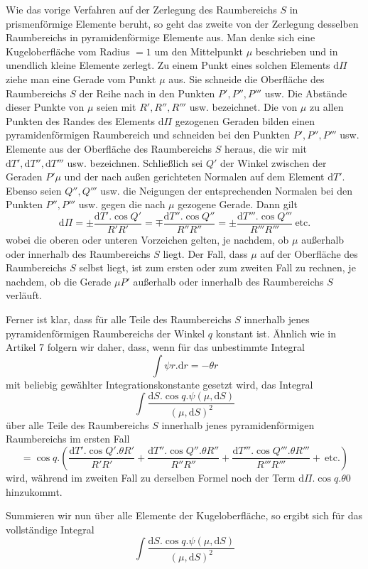 Wie das vorige Verfahren auf der Zerlegung des Raumbereichs $S$ in prismenförmige Elemente beruht, so geht das zweite von der Zerlegung desselben Raumbereichs in pyramidenförmige Elemente aus. Man denke sich eine Kugeloberfläche vom Radius $=1$ um den Mittelpunkt $\mu$ beschrieben und in unendlich kleine Elemente zerlegt. Zu einem Punkt eines solchen Elements $\mathrm{d}\Pi$ ziehe man eine Gerade vom Punkt $\mu$ aus. Sie schneide die Oberfläche des Raumbereichs $S$ der Reihe nach in den Punkten $P',P'',P'''$ usw. Die Abstände dieser Punkte von $\mu$ seien mit $R',R'',R'''$ usw. bezeichnet. Die von $\mu$ zu allen Punkten des Randes des Elements $\mathrm{d}\Pi$ gezogenen Geraden bilden einen pyramidenförmigen Raumbereich und schneiden bei den Punkten $P',P'',P'''$ usw. Elemente aus der Oberfläche des Raumbereichs $S$ heraus, die wir mit $\mathrm{d}T',\mathrm{d}T'',\mathrm{d}T'''$ usw. bezeichnen. Schließlich sei $Q'$ der Winkel zwischen der Geraden $P'\mu$ und der nach außen gerichteten Normalen auf dem Element $\mathrm{d}T'$. Ebenso seien $Q'',Q'''$ usw. die Neigungen der entsprechenden Normalen bei den Punkten $P'',P'''$ usw. gegen die nach $\mu$ gezogene Gerade. Dann gilt
\[
\mathrm{d}\Pi=\pm\frac{\mathrm{d}T'.\cos Q'}{R'R'}=\mp\frac{\mathrm{d}T''.\cos Q''}{R''R''}=\pm\frac{\mathrm{d}T'''.\cos Q'''}{R'''R'''}\ \text{etc.}
\]
wobei die oberen oder unteren Vorzeichen gelten, je nachdem, ob $\mu$ außerhalb oder innerhalb des Raumbereichs $S$ liegt. Der Fall, dass $\mu$ auf der Oberfläche des Raumbereichs $S$ selbst liegt, ist zum ersten oder zum zweiten Fall zu rechnen, je nachdem, ob die Gerade $\mu P'$ außerhalb oder innerhalb des Raumbereichs $S$ verläuft.

Ferner ist klar, dass für alle Teile des Raumbereichs $S$ innerhalb jenes pyramidenförmigen Raumbereichs der Winkel $q$ konstant ist. Ähnlich wie in Artikel 7 folgern wir daher, dass, wenn für das unbestimmte Integral
\[
\int\psi r.\mathrm{d}r=-\theta r
\]
mit beliebig gewählter Integrationskonstante gesetzt wird, das Integral
\[
\int\frac{\mathrm{d}S.\cos q.\psi(\mu,\mathrm{d}S)}{(\mu,\mathrm{d}S)^2}
\]
über alle Teile des Raumbereichs $S$ innerhalb jenes pyramidenförmigen Raumbereichs im ersten Fall
\[
=\cos q.\left(\frac{\mathrm{d}T'.\cos Q'.\theta R'}{R'R'}+\frac{\mathrm{d}T''.\cos Q''.\theta R''}{R''R''}+\frac{\mathrm{d}T'''.\cos Q'''.\theta R'''}{R'''R'''}+\ \text{etc.}\right)
\]
wird, während im zweiten Fall zu derselben Formel noch der Term $\mathrm{d}\Pi.\cos q.\theta0$ hinzukommt.

Summieren wir nun über alle Elemente der Kugeloberfläche, so ergibt sich für das vollständige Integral
\[
\int\frac{\mathrm{d}S.\cos q.\psi(\mu,\mathrm{d}S)}{(\mu,\mathrm{d}S)^2}
\]

